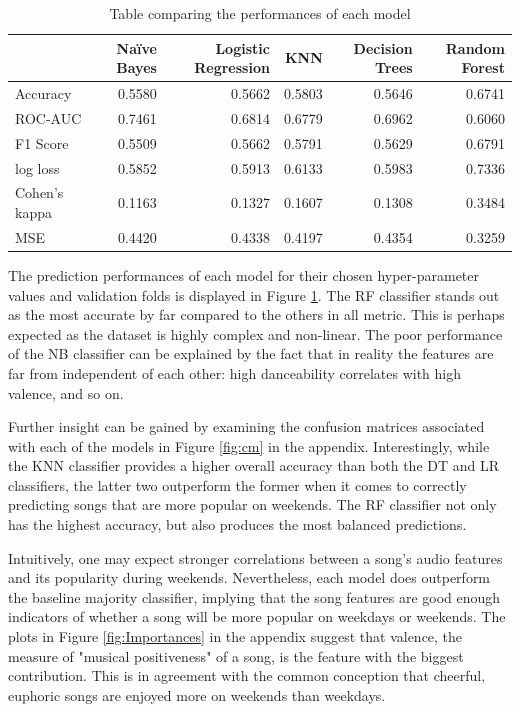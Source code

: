 \documentclass{article}
\begin{document}
\begin{table}[htbp]
\centering
\small
\caption{Table comparing the performances of each model}
\label{tab:Results}
\begin{tabular}{lrrrrr}
\toprule
{} &     Naïve Bayes &     Logistic Regression &    KNN &     Decision Trees &     Random Forest \\
\midrule
Accuracy      & 0.5580 & 0.5662 & 0.5803 & 0.5646 & 0.6741 \\
ROC-AUC  & 0.7461 & 0.6814 & 0.6779 & 0.6962 & 0.6060 \\
F1 Score & 0.5509 & 0.5662 & 0.5791 & 0.5629 & 0.6791 \\
log loss & 0.5852 & 0.5913 & 0.6133 & 0.5983 & 0.7336 \\
Cohen's kappa  & 0.1163 & 0.1327 & 0.1607 & 0.1308 & 0.3484 \\
MSE      & 0.4420 & 0.4338 & 0.4197 & 0.4354 & 0.3259 \\
\bottomrule
\end{tabular}
\end{table}


The prediction performances of each model for their chosen hyper-parameter values and validation folds is displayed in Figure \ref{tab:Results}. The RF classifier stands out as the most accurate by far compared to the others in all metric. This is perhaps expected as the dataset is highly complex and non-linear. The poor performance of the NB classifier can be explained by the fact that in reality the features are far from independent of each other: high danceability correlates with high valence, and so on. 

Further insight can be gained by examining the confusion matrices associated with each of the models in Figure \ref{fig:cm} in the appendix. Interestingly, while the KNN classifier provides a higher overall accuracy than both the DT and LR classifiers, the latter two outperform the former when it comes to correctly predicting songs that are more popular on weekends. The RF classifier not only has the highest accuracy, but also produces the most balanced predictions. 

Intuitively, one may expect stronger correlations between a song's audio features and its popularity during weekends. Nevertheless, each model does outperform the baseline majority classifier, implying that the song features are good enough indicators of whether a song will be more popular on weekdays or weekends. The plots in Figure \ref{fig:Importances} in the appendix suggest that valence, the measure of "musical positiveness" of a song, is the feature with the biggest contribution. This is in agreement with the common conception that cheerful, euphoric songs are enjoyed more on weekends than weekdays. 
\end{document}
